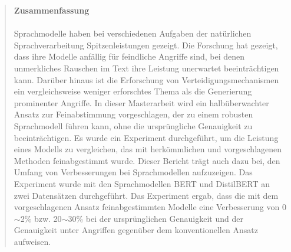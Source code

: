 
\pagestyle{plain}

\begin{quote}
\textbf{\Large Zusammenfassung}\\\\
Sprachmodelle haben bei verschiedenen Aufgaben der natürlichen Sprachverarbeitung Spitzenleistungen gezeigt. Die Forschung hat gezeigt, dass ihre Modelle anfällig für feindliche Angriffe sind, bei denen unmerkliches Rauschen im Text ihre Leistung unerwartet beeinträchtigen kann. Darüber hinaus ist die Erforschung von Verteidigungsmechanismen ein vergleichsweise weniger erforschtes Thema als die Generierung prominenter Angriffe. In dieser Masterarbeit wird ein halbüberwachter Ansatz zur Feinabstimmung vorgeschlagen, der zu einem robusten Sprachmodell führen kann, ohne die ursprüngliche Genauigkeit zu beeinträchtigen. Es wurde ein Experiment durchgeführt, um die Leistung eines Modells zu vergleichen, das mit herkömmlichen und vorgeschlagenen Methoden feinabgestimmt wurde. Dieser Bericht trägt auch dazu bei, den Umfang von Verbesserungen bei Sprachmodellen aufzuzeigen. Das Experiment wurde mit den Sprachmodellen BERT und DistilBERT an zwei Datensätzen durchgeführt. Das Experiment ergab, dass die mit dem vorgeschlagenen Ansatz feinabgestimmten Modelle eine Verbesserung von 0$\sim$2\% bzw. 20$\sim$30\% bei der ursprünglichen Genauigkeit und der Genauigkeit unter Angriffen gegenüber dem konventionellen Ansatz aufweisen. 

\end{quote}

\newpage

